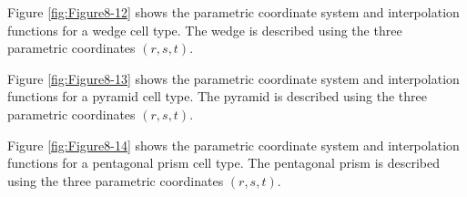 \begin{description}[leftmargin=0cm,labelindent=0cm]
    \item[Wedge.\index{interpolation function!wedge}] Figure \ref{fig:Figure8-12} shows the parametric coordinate system and interpolation functions for a wedge cell type. The wedge is described using the three parametric coordinates $(r,s,t)$.

    \item[Pyramid.\index{interpolation function!pyramid}] Figure \ref{fig:Figure8-13} shows the parametric coordinate system and interpolation functions for a pyramid cell type. The pyramid is described using the three parametric coordinates $(r,s,t)$.

    \item[Pentagonal Prism.\index{interpolation function!pentagonal prism}] Figure \ref{fig:Figure8-14} shows the parametric coordinate system and interpolation functions for a pentagonal prism cell type. The pentagonal prism is described using the three parametric coordinates $(r,s,t)$.


\end{description}
